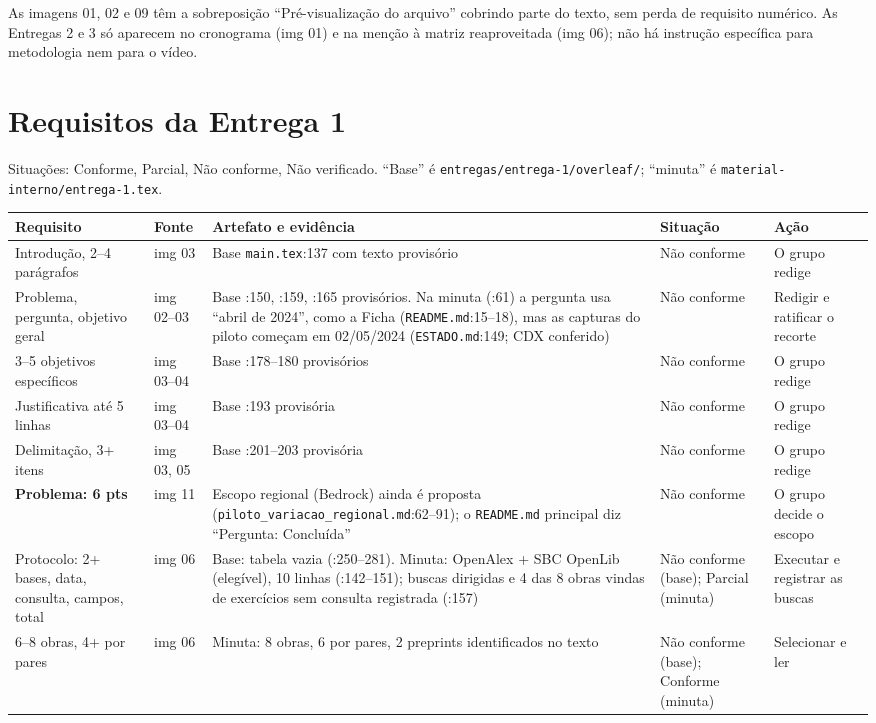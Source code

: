 \documentclass[11pt,a4paper]{article}
\newcommand{\arq}[1]{\nolinkurl{#1}}
\begin{document}
As imagens 01, 02 e 09 têm a sobreposição ``Pré-visualização do arquivo'' cobrindo parte do texto, sem perda de requisito numérico. As Entregas 2 e 3 só aparecem no cronograma (img 01) e na menção à matriz reaproveitada (img 06); não há instrução específica para metodologia nem para o vídeo.

\section{Requisitos da Entrega 1}

Situações: Conforme, Parcial, Não conforme, Não verificado. ``Base'' é \arq{entregas/entrega-1/overleaf/}; ``minuta'' é \arq{material-interno/entrega-1.tex}.

{\small
\begin{longtable}{@{}P{2.9cm}P{1.5cm}P{5.2cm}P{2.0cm}P{3.3cm}@{}}
\toprule
Requisito & Fonte & Artefato e evidência & Situação & Ação \\
\midrule
\endhead
Introdução, 2--4 parágrafos & img 03 & Base \arq{main.tex}:137 com texto provisório & Não conforme & O grupo redige \\
Problema, pergunta, objetivo geral & img 02--03 & Base :150, :159, :165 provisórios. Na minuta (:61) a pergunta usa ``abril de 2024'', como a Ficha (\arq{README.md}:15--18), mas as capturas do piloto começam em 02/05/2024 (\arq{ESTADO.md}:149; CDX conferido) & Não conforme & Redigir e ratificar o recorte \\
3--5 objetivos específicos & img 03--04 & Base :178--180 provisórios & Não conforme & O grupo redige \\
Justificativa até 5 linhas & img 03--04 & Base :193 provisória & Não conforme & O grupo redige \\
Delimitação, 3+ itens & img 03, 05 & Base :201--203 provisória & Não conforme & O grupo redige \\
\textbf{Problema: 6 pts} & img 11 & Escopo regional (Bedrock) ainda é proposta (\arq{piloto_variacao_regional.md}:62--91); o \arq{README.md} principal diz ``Pergunta: Concluída'' & Não conforme & O grupo decide o escopo \\
Protocolo: 2+ bases, data, consulta, campos, total & img 06 & Base: tabela vazia (:250--281). Minuta: OpenAlex + SBC OpenLib (elegível), 10 linhas (:142--151); buscas dirigidas e 4 das 8 obras vindas de exercícios sem consulta registrada (:157) & Não conforme (base); Parcial (minuta) & Executar e registrar as buscas \\
6--8 obras, 4+ por pares & img 06 & Minuta: 8 obras, 6 por pares, 2 preprints identificados no texto & Não conforme (base); Conforme (minuta) & Selecionar e ler \\

\end{longtable}}
\end{document}
